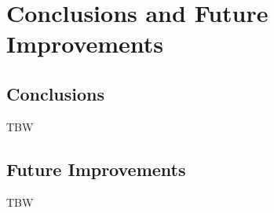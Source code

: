 \chapter{Conclusions and Future Improvements}
\label{chapter:ch5}

\section{Conclusions}

TBW

\section{Future Improvements}

TBW